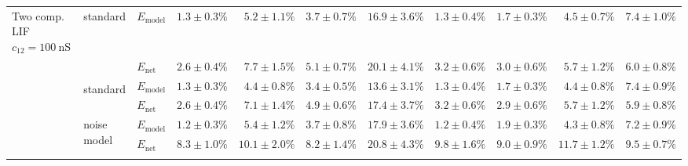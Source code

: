 \begin{sidewaystable}
\begin{tabular}{p{2.2cm} p{1.7cm} l r r r r r r r r }
{	Two comp. LIF $c_{12} = \SI{100}{\nano\siemens}$} &
	\multirow{2}{1.7cm}{\raggedleft %
	standard} &
	$E_\mathrm{model}$ & 
	\color{Gray}$1.3 \pm 0.3\%$ & \color{Gray}$5.2 \pm 1.1\%$ & \color{Gray}$3.7 \pm 0.7\%$ & \color{Gray}$16.9 \pm 3.6\%$ & \color{Gray}$1.3 \pm 0.4\%$ & \color{Gray}$1.7 \pm 0.3\%$ & \color{Gray}$4.5 \pm 0.7\%$ & \color{Gray}$7.4 \pm 1.0\%$
	\\
	& & 
	$E_\mathrm{net}$ &
	\cellcolor{White!82!SteelBlue}$2.6 \pm 0.4\%$ & \cellcolor{White!63!SteelBlue}$7.7 \pm 1.5\%$ & \cellcolor{White!82!SteelBlue}$5.1 \pm 0.7\%$ & \cellcolor{White!44!SteelBlue}$20.1 \pm 4.1\%$ & \cellcolor{White!82!SteelBlue}$3.2 \pm 0.6\%$ & \cellcolor{White!82!SteelBlue}$3.0 \pm 0.6\%$ & \cellcolor{White!82!SteelBlue}$5.7 \pm 1.2\%$ & \cellcolor{White!82!SteelBlue}$6.0 \pm 0.8\%$
	\\\cmidrule(l){2-11}
	&
	\multirow{2}{1.7cm}{\raggedleft %
	standard\textsuperscript{\dag}} &
	$E_\mathrm{model}$ & 
	\color{Gray}$1.3 \pm 0.3\%$ & \color{Gray}$4.4 \pm 0.8\%$ & \color{Gray}$\mathbf{3.4 \pm 0.5\%}$ & \color{Gray}$13.6 \pm 3.1\%$ & \color{Gray}$1.3 \pm 0.4\%$ & \color{Gray}$1.7 \pm 0.3\%$ & \color{Gray}$4.4 \pm 0.8\%$ & \color{Gray}$7.4 \pm 0.9\%$
	\\
	& & 
	$E_\mathrm{net}$ &
	\cellcolor{White!88!SteelBlue}$2.6 \pm 0.4\%$ & \cellcolor{White!88!SteelBlue}$7.1 \pm 1.4\%$ & \cellcolor{White!88!SteelBlue}$4.9 \pm 0.6\%$ & \cellcolor{White!69!SteelBlue}$17.4 \pm 3.7\%$ & \cellcolor{White!88!SteelBlue}$3.2 \pm 0.6\%$ & \cellcolor{White!88!SteelBlue}$2.9 \pm 0.6\%$ & \cellcolor{White!88!SteelBlue}$5.7 \pm 1.2\%$ & \cellcolor{White!94!SteelBlue}$5.9 \pm 0.8\%$
	\\\cmidrule(l){2-11}
	&
	\multirow{2}{1.7cm}{\raggedleft %
	noise model} &
	$E_\mathrm{model}$ & 
	\color{Gray}$1.2 \pm 0.3\%$ & \color{Gray}$5.4 \pm 1.2\%$ & \color{Gray}$3.7 \pm 0.8\%$ & \color{Gray}$17.9 \pm 3.6\%$ & \color{Gray}$1.2 \pm 0.4\%$ & \color{Gray}$1.9 \pm 0.3\%$ & \color{Gray}$4.3 \pm 0.8\%$ & \color{Gray}$7.2 \pm 0.9\%$
	\\
	& & 
	$E_\mathrm{net}$ &
	\cellcolor{White!25!SteelBlue}$8.3 \pm 1.0\%$ & \cellcolor{White!38!SteelBlue}$10.1 \pm 2.0\%$ & \cellcolor{White!32!SteelBlue}$8.2 \pm 1.4\%$ & \cellcolor{White!38!SteelBlue}$20.8 \pm 4.3\%$ & \cellcolor{White!13!SteelBlue}$9.8 \pm 1.6\%$ & \cellcolor{White!19!SteelBlue}$9.0 \pm 0.9\%$ & \cellcolor{White!19!SteelBlue}$11.7 \pm 1.2\%$ & \cellcolor{White!32!SteelBlue}$9.5 \pm 0.7\%$
	\\\cmidrule(l){2-11}
	&
	\multirow{2}{1.7cm}{\raggedleft %
}
\end{tabular}
\end{sidewaystable}
